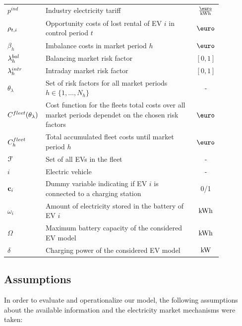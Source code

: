 \documentclass[a4paper, 12pt]{article}
\begin{document}
\begin{longtable}{p{0.11\linewidth}|p{0.75\linewidth}|c}
\(p^{ind}\) & Industry electricity tariff & \(\ekwh\)\\
\(\rho_{t,i}\) & Opportunity costs of lost rental of EV \(i\) in control period \(t\) & \(\eur\)\\
\(\beta_h\) & Imbalance costs in market period \(h\) & \(\eur\)\\
\hline
\(\lambda^{bal}_{h}\) & Balancing market risk factor & \([0,1]\)\\
\(\lambda^{intr}_{h}\) & Intraday market risk factor & \([0,1]\)\\
\(\theta_{\lambda}\) & Set of risk factors for all market periods \(h\!\in\!\{1,\hdots,N_h\}\) & -\\
\(C^{fleet}_{}(\theta_{\lambda})\) & Cost function for the fleets total costs over all market periods dependet on the chosen risk factors & \(\eur\)\\
\(C^{fleet}_{h}\) & Total accumulated fleet costs until market period \(h\) & \(\eur\)\\
\hline
\({\cal{F}}\) & Set of all EVs in the fleet & -\\
\(i\) & Electric vehicle & -\\
\({\bf{c}}_{i}\) & Dummy variable indicating if EV \(i\) is connected to a charging station & 0/1\\
\(\omega_{i}\) & Amount of electricity stored in the battery of EV \(i\) & \(\text{kWh}\)\\
\(\Omega\) & Maximum battery capacity of the considered EV model & \(\text{kWh}\)\\
\(\delta\) & Charging power of the considered EV model & \(\text{kW}\)\\
\hline
\end{longtable}

\subsection{Assumptions \label{sec-model-assumptions}}
\label{sec:orgcc91abe}

In order to evaluate and operationalize our model, the following assumptions
about the available information and the electricity market mechanisms were
taken:
\end{document}
